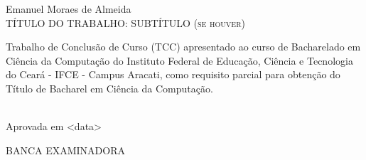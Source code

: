 \begin{folhadeaprovacao}
\vfill
\begin{center}

{Emanuel Moraes de Almeida\\}
\vspace{1.5cm}
{\textsc{TÍTULO DO TRABALHO: SUBTÍTULO (se houver)}\\}
\vspace{1.5cm}
\hspace{.45\linewidth}
\begin{minipage}{.50\linewidth}
Trabalho de Conclusão de Curso (TCC) apresentado ao curso de Bacharelado em Ciência da Computação do Instituto Federal de Educação, Ciência e Tecnologia do Ceará - IFCE - Campus Aracati, como requisito parcial para obtenção do Título de Bacharel em Ciência da Computação. 
\end{minipage}
\vspace{1.0 cm}

\end{center}

\noindent\\
{Aprovada em <data>}

\vspace{1.5 cm}
\begin{center}
{BANCA EXAMINADORA}

\end{center}
\end{folhadeaprovacao}
